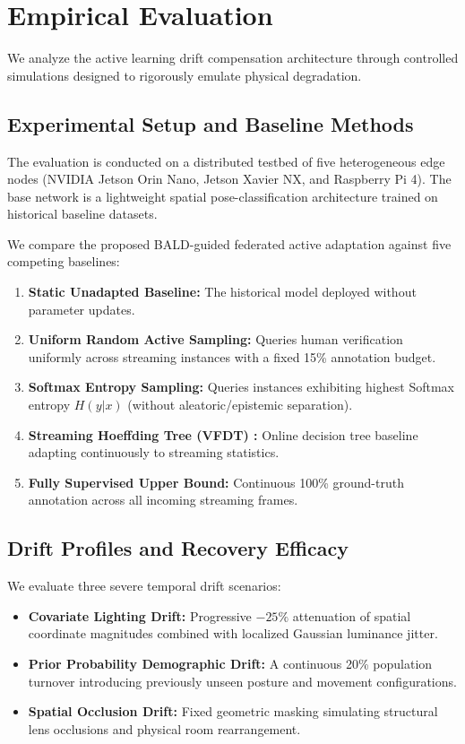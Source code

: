 \documentclass[conference]{IEEEtran}
\begin{document}
\section{Empirical Evaluation}

We analyze the active learning drift compensation architecture through controlled simulations designed to rigorously emulate physical degradation.

\subsection{Experimental Setup and Baseline Methods}
The evaluation is conducted on a distributed testbed of five heterogeneous edge nodes (NVIDIA Jetson Orin Nano, Jetson Xavier NX, and Raspberry Pi 4). The base network is a lightweight spatial pose-classification architecture trained on historical baseline datasets.

We compare the proposed BALD-guided federated active adaptation against five competing baselines:
\begin{enumerate}
    \item \textbf{Static Unadapted Baseline:} The historical model deployed without parameter updates.
    \item \textbf{Uniform Random Active Sampling:} Queries human verification uniformly across streaming instances with a fixed 15\% annotation budget.
    \item \textbf{Softmax Entropy Sampling:} Queries instances exhibiting highest Softmax entropy $H(y|x)$ (without aleatoric/epistemic separation).
    \item \textbf{Streaming Hoeffding Tree (VFDT) \cite{b16}:} Online decision tree baseline adapting continuously to streaming statistics.
    \item \textbf{Fully Supervised Upper Bound:} Continuous 100\% ground-truth annotation across all incoming streaming frames.
\end{enumerate}

\subsection{Drift Profiles and Recovery Efficacy}
We evaluate three severe temporal drift scenarios:
\begin{itemize}
    \item \textbf{Covariate Lighting Drift:} Progressive $-25\%$ attenuation of spatial coordinate magnitudes combined with localized Gaussian luminance jitter.
    \item \textbf{Prior Probability Demographic Drift:} A continuous 20\% population turnover introducing previously unseen posture and movement configurations.
    \item \textbf{Spatial Occlusion Drift:} Fixed geometric masking simulating structural lens occlusions and physical room rearrangement.
\end{itemize}
\end{document}
